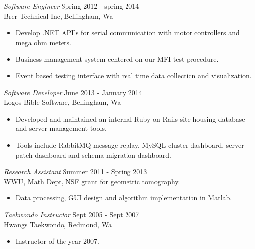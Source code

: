\documentclass[line,margin]{res}
\begin{document}
\begin{resume}
		{\sl Software Engineer} \hfill Spring 2012 - spring 2014 \\
                	Brer Technical Inc, Bellingham, Wa
                	\begin{itemize}  \itemsep -2pt
                		\item Develop .NET API's for serial communication with motor controllers and mega ohm meters.
                		\item Business management system centered on our MFI test procedure.
			\item Event based testing interface with real time data collection and visualization.  
               	 \end{itemize}
 
		{\sl Software Developer} \hfill June 2013 - January 2014 \\
                	Logos Bible Software, Bellingham, Wa
               	 \begin{itemize}  \itemsep -2pt
                		\item Developed and maintained an internal Ruby on Rails site housing database and server management tools. 
	     		\item Tools include RabbitMQ message replay, MySQL cluster dashboard, server patch dashboard and schema migration dashboard.
                	\end{itemize}

                	{\sl Research Assistant} \hfill            Summer 2011 - Spring 2013 \\
                	WWU, Math Dept, NSF grant for geometric tomography.
                 	\begin{itemize}  \itemsep -2pt
                 		\item Data processing, GUI design and algorithm implementation in Matlab.
                 	\end{itemize} 


		{\sl Taekwondo Instructor} \hfill Sept 2005 - Sept 2007 \\
		Hwangs Taekwondo, Redmond, Wa
		\begin{itemize}
			\item Instructor of the year 2007.
		\end{itemize}
	

\end{resume}
\end{document}
